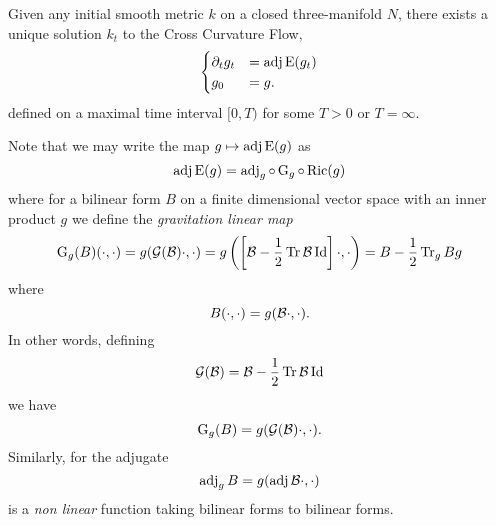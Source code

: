 \documentclass[a4paper, 12pt]{amsart}
\begin{document}
\begin{thm}
\label{thm:xcf_existence_uniqueness}

Given any initial smooth metric \(k\) on a closed three-manifold \(N\), there exists a unique solution \(k_t\) to the Cross Curvature Flow,
\[
\begin{cases}
\partial_t g_t &= \operatorname{adj}\operatorname{E}(g_t) \\
g_0 &= g.
\end{cases}
\]
defined on a maximal time interval \([0, T)\) for some \(T > 0\) or \(T = \infty\).
\end{thm}

Note that we may write the map \(g \mapsto \operatorname{adj}\operatorname{E}(g)\) as
\begin{equation}
\label{eq:adjein_op}
\operatorname{adj}\operatorname{E}(g) = \operatorname{adj}_g \circ \operatorname{G}_g \circ \operatorname{Ric} (g)
\end{equation}
where for a bilinear form \(B\) on a finite dimensional vector space with an inner product \(g\) we define the \emph{gravitation linear map}
\[
\operatorname{G}_g(B) (\cdot, \cdot) = g(\operatorname{\mathcal{G}}(\mathcal{B}) \cdot, \cdot) = g\left(\left[\mathcal{B} - \frac{1}{2} \operatorname{Tr}\mathcal{B} \operatorname{Id}\right] \cdot, \cdot\right) = B - \frac{1}{2} \operatorname{Tr}_g B g
\]
where
\[
B(\cdot, \cdot) = g(\mathcal{B} \cdot, \cdot).
\]
In other words, defining
\[
\operatorname{\mathcal{G}}(\mathcal{B}) = \mathcal{B} - \frac{1}{2} \operatorname{Tr} \mathcal{B} \operatorname{Id}
\]
we have
\[
\operatorname{G}_g(B) = g(\operatorname{\mathcal{G}}(\mathcal{B}) \cdot, \cdot).
\]
Similarly, for the adjugate
\[
\operatorname{adj}_g B = g(\operatorname{adj}\mathcal{B} \cdot, \cdot)
\]
is a \emph{non linear} function taking bilinear forms to bilinear forms.
\end{document}
